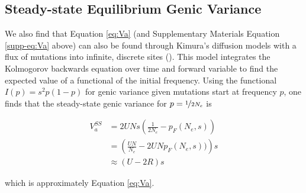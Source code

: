 \documentclass[11pt]{article}
\begin{document}
\subsection{Steady-state Equilibrium Genic Variance} \label{supp:genic-va}

We also find that Equation \eqref{eq:Va} (and Supplementary Materials Equation
\ref{supp-eq:Va} above) can also be found through Kimura's diffusion models
with a flux of mutations into infinite, discrete sites
(\citeyear{Kimura1969-jw}). This model integrates the Kolmogorov backwards
equation over time and forward variable to find the expected value of a
functional of the initial frequency. Using the functional $I(p) = s^2 p(1-p)$
for genic variance given mutations start at frequency $p$, one finds that the
steady-state genic variance for $p=\nicefrac{1}{2N_e}$ is

\begin{align}
    V_a^{SS} &= 2 U N s \left(\frac{1}{2N_e} - p_F(N_e, s)\right) \\
             &= \left(\frac{UN}{N_e} - 2 U Np_F(N_e, s))\right)s \nonumber \\
             &\approx \left(U - 2 R\right)s \nonumber
\end{align}

which is approximately Equation \eqref{eq:Va}.


\end{document}
